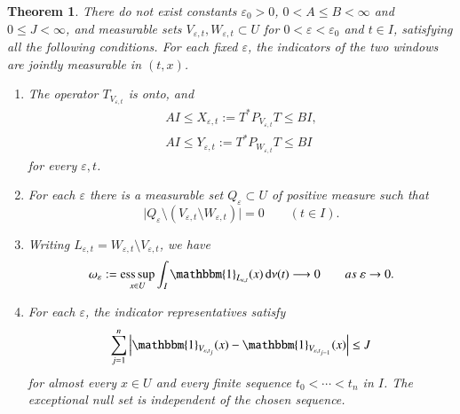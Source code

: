 \documentclass[10pt,a4paper]{amsart}
\newtheorem{theorem}{Theorem}[section]
\def\d{\mathrm{d}}
\newcommand\1{\mathbbm{1}}
\newcommand{\eps}{\varepsilon}
\def\d{\mathrm{d}}
\begin{document}
\begin{theorem}\label{thm:abstract-windows}
There do not exist constants $\eps_0>0$, $0<A\le B<\infty$ and $0\le J<\infty$,
and measurable sets $V_{\eps,t},W_{\eps,t}\subset U$ for
$0<\eps<\eps_0$ and $t\in I$, satisfying all the following conditions.
For each fixed $\eps$, the indicators of the two windows are jointly measurable
in $(t,x)$.
\begin{enumerate}
    \item[(i)] The operator $T_{V_{\eps,t}}$ is onto, and
    \begin{equation}\label{eq:main-window-bounds}
        \begin{aligned}
            AI\le X_{\eps,t}:=T^*P_{V_{\eps,t}}T\le BI,\\
            AI\le Y_{\eps,t}:=T^*P_{W_{\eps,t}}T\le BI
        \end{aligned}
    \end{equation}
    for every $\eps,t$.

    \item[(ii)] For each $\eps$ there is a measurable set $Q_\eps\subset U$
    of positive measure such that
    \begin{equation*}
        \bigl|Q_\eps\setminus(V_{\eps,t}\setminus W_{\eps,t})\bigr|=0
        \qquad(t\in I).
    \end{equation*}

    \item[(iii)] Writing $L_{\eps,t}=W_{\eps,t}\setminus V_{\eps,t}$, we have
    \begin{equation}\label{eq:main-loss-overlap}
        \omega_\eps:=\operatorname*{ess\,sup}_{x\in U}
        \int_I\1_{L_{\eps,t}}(x)\,\d\nu(t)
        \longrightarrow0\qquad{\rm{as}}\ \eps\to0.
    \end{equation}

    \item[(iv)] For each $\eps$, the indicator representatives satisfy
    \begin{equation}\label{eq:main-turnover}
        \sum_{j=1}^{n}
        \left|\1_{V_{\eps,t_j}}(x)-\1_{V_{\eps,t_{j-1}}}(x)\right|
        \le J
    \end{equation}
    for almost every $x\in U$ and every finite sequence
    $t_0<\cdots<t_n$ in $I$. The exceptional null set is independent of
    the chosen sequence.
\end{enumerate}
\end{theorem}
\end{document}
